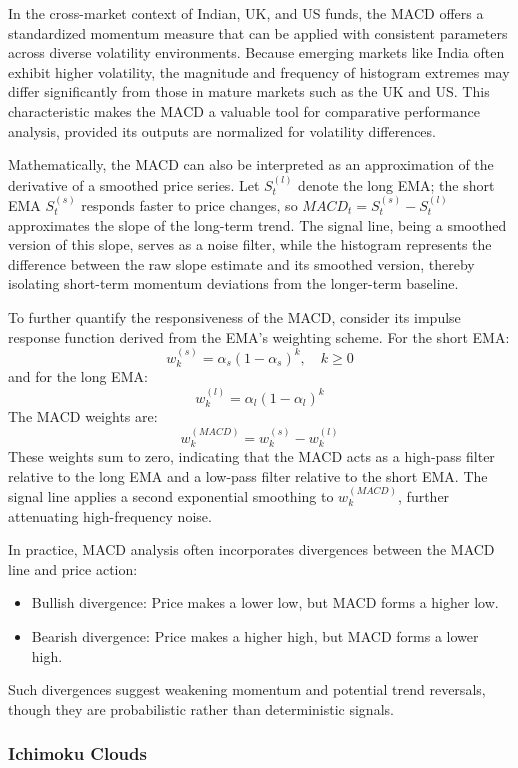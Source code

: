 In the cross-market context of Indian, UK, and US funds, the MACD offers a standardized momentum measure that can be applied with consistent parameters across diverse volatility environments. Because emerging markets like India often exhibit higher volatility, the magnitude and frequency of histogram extremes may differ significantly from those in mature markets such as the UK and US. This characteristic makes the MACD a valuable tool for comparative performance analysis, provided its outputs are normalized for volatility differences.

Mathematically, the MACD can also be interpreted as an approximation of the derivative of a smoothed price series. Let $S_t^{(l)}$ denote the long EMA; the short EMA $S_t^{(s)}$ responds faster to price changes, so $MACD_t = S_t^{(s)} - S_t^{(l)}$ approximates the slope of the long-term trend. The signal line, being a smoothed version of this slope, serves as a noise filter, while the histogram represents the difference between the raw slope estimate and its smoothed version, thereby isolating short-term momentum deviations from the longer-term baseline.

To further quantify the responsiveness of the MACD, consider its impulse response function derived from the EMA's weighting scheme. For the short EMA:
\[
w_k^{(s)} = \alpha_s (1 - \alpha_s)^k, \quad k \ge 0
\]
and for the long EMA:
\[
w_k^{(l)} = \alpha_l (1 - \alpha_l)^k
\]
The MACD weights are:
\[
w_k^{(MACD)} = w_k^{(s)} - w_k^{(l)}
\]
These weights sum to zero, indicating that the MACD acts as a high-pass filter relative to the long EMA and a low-pass filter relative to the short EMA. The signal line applies a second exponential smoothing to $w_k^{(MACD)}$, further attenuating high-frequency noise.

In practice, MACD analysis often incorporates divergences between the MACD line and price action:
\begin{itemize}
    \item Bullish divergence: Price makes a lower low, but MACD forms a higher low.
    \item Bearish divergence: Price makes a higher high, but MACD forms a lower high.
\end{itemize}
Such divergences suggest weakening momentum and potential trend reversals, though they are probabilistic rather than deterministic signals.


\subsubsection{Ichimoku Clouds}

